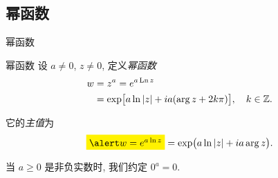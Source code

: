 %
%


\subsection{幂函数}
\begin{frame}{幂函数}
\onslide<+->
\begin{alertblock}{幂函数}
设 $a\neq 0$, $z\neq 0$, 定义\emph{幂函数}
\begin{align*}
w&=z^a=e^{a\operatorname{Ln} z}\\
&=\exp\bigl[a\ln\left|z\right|+ia(\arg z+2k\pi)\bigr],\quad k\in{\mathbb{Z}}.
\end{align*}
\end{alertblock}
\onslide<+->
它的\emph{主值}为
\[\abox{$w=e^{a\ln z}$}=\exp\bigl(a\ln\abs{z}+ia\arg z\bigr).\]

\onslide<+->
当 $a\ge 0$ 是非负实数时, 我们约定 $0^a=0$.
\end{frame}


